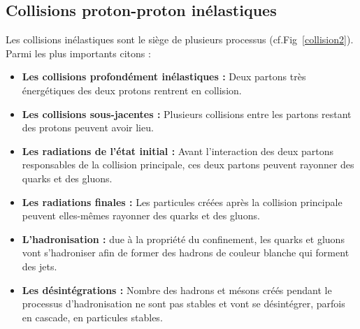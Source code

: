 \subsection{Collisions proton-proton inélastiques}
Les collisions inélastiques sont le siège de plusieurs processus (cf.Fig~\ref{collision2}). Parmi les plus importants citons :
\begin{itemize}[label=$\bullet$]
	\item \textbf{Les collisions profondément inélastiques :} Deux partons très énergétiques des deux protons rentrent en collision.
	\item \textbf{Les collisions sous-jacentes :} Plusieurs collisions entre les partons restant des protons peuvent avoir lieu.
	\item \textbf{Les radiations de l'état initial :} Avant l'interaction des deux partons responsables de la collision principale, ces deux partons peuvent rayonner des quarks et des gluons.
	\item \textbf{Les radiations finales :} Les particules créées après la collision principale peuvent elles-mêmes rayonner des quarks et des gluons.
	\item \textbf{L'hadronisation :} due à la propriété du confinement, les quarks et gluons vont s'hadroniser afin de former des hadrons de couleur blanche qui forment des jets.
	\item \textbf{Les désintégrations :} Nombre des hadrons et mésons créés pendant le processus d'hadronisation ne sont pas stables et vont se désintégrer, parfois en cascade, en particules stables.
\end{itemize}

